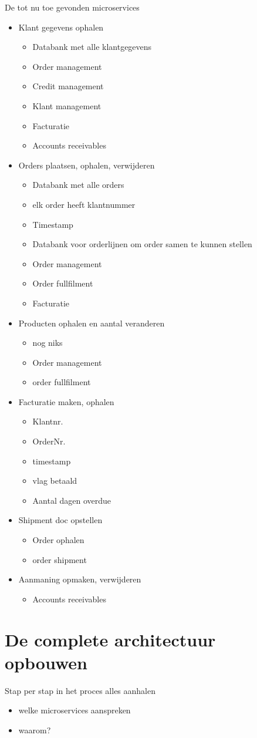 De tot nu toe gevonden microservices
\begin{itemize}
	\item Klant gegevens ophalen
		\begin{itemize}
			\item Databank met alle klantgegevens
			\item Order management
			\item Credit management
			\item Klant management
			\item Facturatie
			\item Accounts receivables
		\end{itemize}
	\item Orders plaatsen, ophalen, verwijderen
		\begin{itemize}
			\item Databank met alle orders
			\item elk order heeft klantnummer
			\item Timestamp
			\item Databank voor orderlijnen om order samen te kunnen stellen
			\item Order management
			\item Order fullfilment
			\item Facturatie
		\end{itemize}
	\item Producten ophalen en aantal veranderen
		\begin{itemize}
			\item nog niks
			\item Order management
			\item order fullfilment
		\end{itemize}
	\item Facturatie maken, ophalen
		\begin{itemize}
			\item Klantnr.
			\item OrderNr.
			\item timestamp
			\item vlag betaald
			\item Aantal dagen overdue
		\end{itemize}
	\item Shipment doc opstellen
		\begin{itemize}
			\item Order ophalen
			\item order shipment
		\end{itemize}
	\item Aanmaning opmaken, verwijderen
		\begin{itemize}
			\item Accounts receivables
		\end{itemize}
\end{itemize}


\section{De complete architectuur opbouwen}
Stap per stap in het proces alles aanhalen
\begin{itemize}
	\item welke microservices aanspreken
	\item waarom?
\end{itemize}



